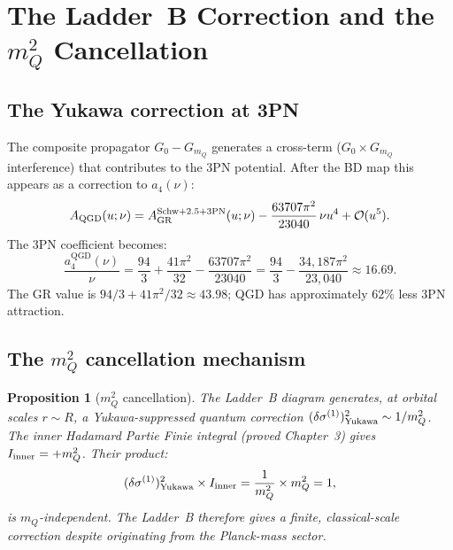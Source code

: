 \documentclass[11pt,a4paper]{article}
\theoremstyle{plain}
\newtheorem{proposition}[theorem]{Proposition}
\theoremstyle{definition}
\theoremstyle{remark}
\newcommand{\mQ}{m_Q}
\newcommand{\GR}{\mathrm{GR}}
\newcommand{\QGD}{\mathrm{QGD}}
\begin{document}
\section{The Ladder~B Correction and the $m_Q^2$ Cancellation}
\label{sec:ladderB}

\subsection{The Yukawa correction at 3PN}

The composite propagator $G_0-G_{\mQ}$ generates a cross-term
($G_0\times G_{\mQ}$ interference) that contributes to the 3PN potential.
After the BD map this appears as a correction to $a_4(\nu)$:
\begin{equation}
  A_{\QGD}(u;\nu) = A_{\GR}^{\rm Schw+2.5+3PN}(u;\nu)
  - \frac{63707\pi^2}{23040}\,\nu u^4
  + \mathcal{O}(u^5).
  \label{eq:AQGD}
\end{equation}
The 3PN coefficient becomes:
\begin{equation}
  \frac{a_4^{\QGD}(\nu)}{\nu}
  = \frac{94}{3} + \frac{41\pi^2}{32} - \frac{63707\pi^2}{23040}
  = \frac{94}{3} - \frac{34{,}187\pi^2}{23{,}040}
  \approx 16.69.
  \label{eq:a4QGD}
\end{equation}
The GR value is $94/3+41\pi^2/32\approx 43.98$; QGD has approximately
$62\%$ less 3PN attraction.

\subsection{The $m_Q^2$ cancellation mechanism}

\begin{proposition}[$m_Q^2$ cancellation]
\label{prop:mQ2}
The Ladder~B diagram generates, at orbital scales $r\sim R$, a
Yukawa-suppressed quantum correction
$(\delta\sigma^{(1)})^2_{\rm Yukawa}\sim 1/\mQ^2$.
The inner Hadamard Partie Finie integral (proved Chapter~3) gives
$I_{\rm inner} = +\mQ^2$.  Their product:
\begin{equation}
  (\delta\sigma^{(1)})^2_{\rm Yukawa}\times I_{\rm inner}
  = \frac{1}{\mQ^2}\times\mQ^2 = 1,
  \label{eq:cancellation}
\end{equation}
is $\mQ$-independent.  The Ladder~B therefore gives a finite,
classical-scale correction despite originating from the Planck-mass
sector.
\end{proposition}
\end{document}
